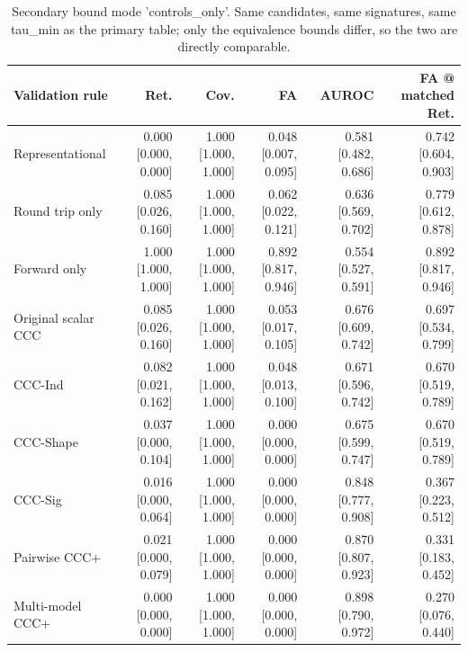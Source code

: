 \begin{table}[t]
\centering
\small
\begin{tabular}{lrrrrr}
\toprule
Validation rule & Ret. & Cov. & FA & AUROC & FA @ matched Ret. \\
\midrule
Representational & 0.000 [0.000, 0.000] & 1.000 [1.000, 1.000] & 0.048 [0.007, 0.095] & 0.581 [0.482, 0.686] & 0.742 [0.604, 0.903] \\
Round trip only & 0.085 [0.026, 0.160] & 1.000 [1.000, 1.000] & 0.062 [0.022, 0.121] & 0.636 [0.569, 0.702] & 0.779 [0.612, 0.878] \\
Forward only & 1.000 [1.000, 1.000] & 1.000 [1.000, 1.000] & 0.892 [0.817, 0.946] & 0.554 [0.527, 0.591] & 0.892 [0.817, 0.946] \\
Original scalar CCC & 0.085 [0.026, 0.160] & 1.000 [1.000, 1.000] & 0.053 [0.017, 0.105] & 0.676 [0.609, 0.742] & 0.697 [0.534, 0.799] \\
CCC-Ind & 0.082 [0.021, 0.162] & 1.000 [1.000, 1.000] & 0.048 [0.013, 0.100] & 0.671 [0.596, 0.742] & 0.670 [0.519, 0.789] \\
CCC-Shape & 0.037 [0.000, 0.104] & 1.000 [1.000, 1.000] & 0.000 [0.000, 0.000] & 0.675 [0.599, 0.747] & 0.670 [0.519, 0.789] \\
CCC-Sig & 0.016 [0.000, 0.064] & 1.000 [1.000, 1.000] & 0.000 [0.000, 0.000] & 0.848 [0.777, 0.908] & 0.367 [0.223, 0.512] \\
Pairwise CCC+ & 0.021 [0.000, 0.079] & 1.000 [1.000, 1.000] & 0.000 [0.000, 0.000] & 0.870 [0.807, 0.923] & 0.331 [0.183, 0.452] \\
Multi-model CCC+ & 0.000 [0.000, 0.000] & 1.000 [1.000, 1.000] & 0.000 [0.000, 0.000] & 0.898 [0.790, 0.972] & 0.270 [0.076, 0.440] \\
\bottomrule
\end{tabular}
\caption{Secondary bound mode 'controls\_only'. Same candidates, same signatures, same tau\_min as the primary table; only the equivalence bounds differ, so the two are directly comparable.}
\label{tab:table_5_1_controlled__controls_only}
\end{table}